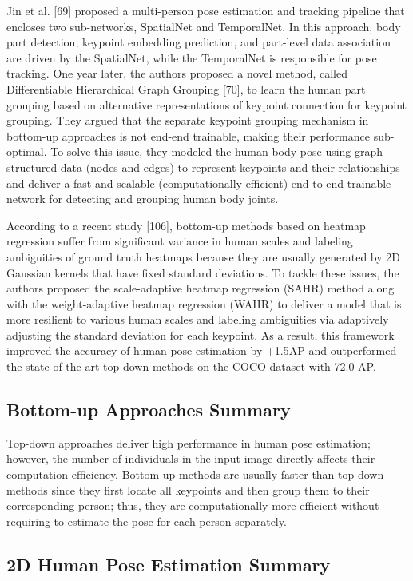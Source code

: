 Jin et al. [69] proposed a multi-person pose estimation and tracking pipeline that encloses two sub-networks, SpatialNet and TemporalNet. In this approach, body part detection, keypoint embedding prediction, and part-level data association are driven by the SpatialNet, while the TemporalNet is responsible for pose tracking. One year later, the authors proposed a novel method, called Differentiable Hierarchical Graph Grouping  [70], to learn the human part grouping based on alternative representations of keypoint connection for keypoint grouping. They argued that the separate keypoint grouping mechanism in bottom-up approaches is not end-end trainable, making their performance sub-optimal. To solve this issue, they modeled the human body pose using graph-structured data (nodes and edges) to represent keypoints and their relationships and deliver a fast and scalable (computationally efficient) end-to-end trainable network for detecting and grouping human body joints. 

According to a recent study [106], bottom-up methods based on heatmap regression suffer from significant variance in human scales and labeling ambiguities of ground truth heatmaps because they are usually generated by 2D Gaussian kernels that have fixed standard deviations. To tackle these issues, the authors proposed the scale-adaptive heatmap regression (SAHR) method along with the weight-adaptive heatmap regression (WAHR) to deliver a model that is more resilient to various human scales and labeling ambiguities via adaptively adjusting the standard deviation for each keypoint. As a result, this framework improved the accuracy of human pose estimation by +1.5AP and outperformed the state-of-the-art top-down methods on the COCO dataset with 72.0 AP.


\subsection*{Bottom-up Approaches Summary}

Top-down approaches deliver high performance in human pose estimation; however, the number of individuals in the input image directly affects their computation efficiency. Bottom-up methods are usually faster than top-down methods since they first locate all keypoints and then group them to their corresponding person; thus, they are computationally more efficient without requiring to estimate the pose for each person separately. 

 
\subsection{2D Human Pose Estimation Summary}


